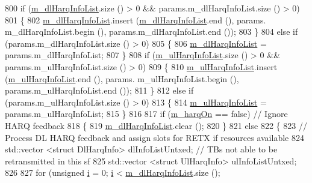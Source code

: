 \begin{DoxyCode}
800         \textcolor{keywordflow}{if} (\hyperlink{classns3_1_1MmWaveFlexTtiPfMacScheduler_a71cf056c010c970921c28871ed145af0}{m\_dlHarqInfoList}.size () > 0 && params.m\_dlHarqInfoList.size () > 0)
801         \{
802                 \hyperlink{classns3_1_1MmWaveFlexTtiPfMacScheduler_a71cf056c010c970921c28871ed145af0}{m\_dlHarqInfoList}.insert (\hyperlink{classns3_1_1MmWaveFlexTtiPfMacScheduler_a71cf056c010c970921c28871ed145af0}{m\_dlHarqInfoList}.end (), params.
      m\_dlHarqInfoList.begin (), params.m\_dlHarqInfoList.end ());
803         \}
804         \textcolor{keywordflow}{else} \textcolor{keywordflow}{if} (params.m\_dlHarqInfoList.size () > 0)
805         \{
806                 \hyperlink{classns3_1_1MmWaveFlexTtiPfMacScheduler_a71cf056c010c970921c28871ed145af0}{m\_dlHarqInfoList} = params.m\_dlHarqInfoList;
807         \}
808         \textcolor{keywordflow}{if} (\hyperlink{classns3_1_1MmWaveFlexTtiPfMacScheduler_ad0251a6033c790a29ff25da7426ffd38}{m\_ulHarqInfoList}.size () > 0 && params.m\_ulHarqInfoList.size () > 0)
809         \{
810                 \hyperlink{classns3_1_1MmWaveFlexTtiPfMacScheduler_ad0251a6033c790a29ff25da7426ffd38}{m\_ulHarqInfoList}.insert (\hyperlink{classns3_1_1MmWaveFlexTtiPfMacScheduler_ad0251a6033c790a29ff25da7426ffd38}{m\_ulHarqInfoList}.end (), params.
      m\_ulHarqInfoList.begin (), params.m\_ulHarqInfoList.end ());
811         \}
812         \textcolor{keywordflow}{else} \textcolor{keywordflow}{if} (params.m\_ulHarqInfoList.size () > 0)
813         \{
814                 \hyperlink{classns3_1_1MmWaveFlexTtiPfMacScheduler_ad0251a6033c790a29ff25da7426ffd38}{m\_ulHarqInfoList} = params.m\_ulHarqInfoList;
815         \}
816 
817         \textcolor{keywordflow}{if} (\hyperlink{classns3_1_1MmWaveFlexTtiPfMacScheduler_ab7edfa7baaf0e2ce6c2ba43efc59e291}{m\_harqOn} == \textcolor{keyword}{false})          \textcolor{comment}{// Ignore HARQ feedback}
818         \{
819                 \hyperlink{classns3_1_1MmWaveFlexTtiPfMacScheduler_a71cf056c010c970921c28871ed145af0}{m\_dlHarqInfoList}.clear ();
820         \}
821         \textcolor{keywordflow}{else}
822         \{
823                 \textcolor{comment}{// Process DL HARQ feedback and assign slots for RETX if resources available}
824                 std::vector <struct DlHarqInfo> dlInfoListUntxed;  \textcolor{comment}{// TBs not able to be retransmitted in
       this sf}
825                 std::vector <struct UlHarqInfo> ulInfoListUntxed;
826 
827                 \textcolor{keywordflow}{for} (\textcolor{keywordtype}{unsigned} \hyperlink{bernuolliDistribution_8m_a6f6ccfcf58b31cb6412107d9d5281426}{i} = 0; \hyperlink{bernuolliDistribution_8m_a6f6ccfcf58b31cb6412107d9d5281426}{i} < \hyperlink{classns3_1_1MmWaveFlexTtiPfMacScheduler_a71cf056c010c970921c28871ed145af0}{m\_dlHarqInfoList}.size (); 

\end{DoxyCode}
